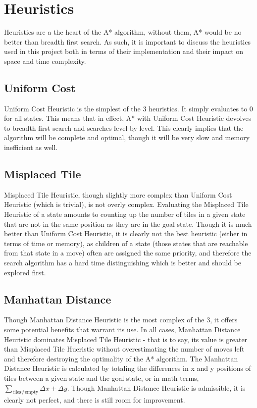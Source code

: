 \documentclass{article}
\begin{document}
\section{Heuristics}
Heuristics are a the heart of the A* algorithm, without them, A* would be no better than breadth first search. As such, it is important to discuss the heuristics used in this project both in terms of their implementation and their impact on space and time complexity.
\subsection{Uniform Cost}
Uniform Cost Heuristic is the simplest of the 3 heuristics. It simply evaluates to 0 for all states. This means that in effect, A* with Uniform Cost Heuristic devolves to breadth first search and searches level-by-level. This clearly implies that the algorithm will be complete and optimal, though it will be very slow and memory inefficient as well.
\subsection{Misplaced Tile}
Misplaced Tile Heuristic, though slightly more complex than Uniform Cost Heuristic (which is trivial), is not overly complex. Evaluating the Misplaced Tile Heuristic of a state amounts to counting up the number of tiles in a given state that are not in the same position as they are in the goal state. Though it is much better than Uniform Cost Heuristic, it is clearly not the best heuristic (either in terms of time or memory), as children of a state (those states that are reachable from that state in a move) often are assigned the same priority, and therefore the search algorithm has a hard time distinguishing which is better and should be explored first.
\pagebreak
\subsection{Manhattan Distance}
Though Manhattan Distance Heuristic is the most complex of the 3, it offers some potential benefits that warrant its use. In all cases, Manhattan Distance Heuristic dominates Misplaced Tile Heuristic - that is to say, its value is greater than Misplaced Tile Hueristic without overestimating the number of moves left and therefore destroying the optimality of the A* algorithm. The Manhattan Distance Heuristic is calculated by totaling the differences in x and y positions of tiles between a given state and the goal state, or in math terms, $\sum_{\text{tiles}\neq\text{empty}}\Delta x + \Delta y$. Though Manhattan Distance Heuristic is admissible, it is clearly not perfect, and there is still room for improvement.
\end{document}
